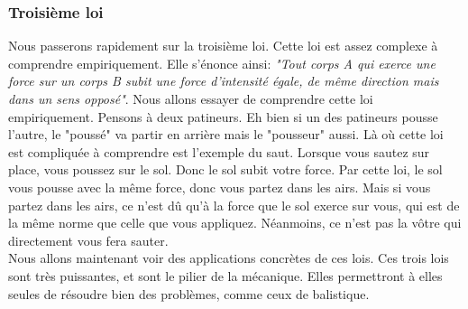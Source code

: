 \documentclass{article}
\begin{document}
\subsubsection{Troisième loi}
Nous passerons rapidement sur la troisième loi. Cette loi est assez complexe à comprendre empiriquement. Elle s'énonce ainsi: \textit{"Tout corps A qui exerce une force sur un corps B subit une force d'intensité égale, de même direction mais dans un sens opposé"}. 
Nous allons essayer de comprendre cette loi empiriquement. Pensons à deux patineurs. Eh bien si un des patineurs pousse l'autre, le "poussé" va partir en arrière 
mais le "pousseur" aussi. Là où cette loi est compliquée à comprendre est l'exemple du saut. Lorsque vous sautez sur place, vous poussez sur le sol. Donc le sol
subit votre force. Par cette loi, le sol vous pousse avec la même force, donc vous partez dans les airs. Mais si vous partez dans les airs, ce n'est dû qu'à
la force que le sol exerce sur vous, qui est de la même norme que celle que vous appliquez. Néanmoins, ce n'est pas la vôtre qui directement vous fera sauter. \\
Nous allons maintenant voir des applications concrètes de ces lois. 
Ces trois lois sont très puissantes, et sont le pilier de la mécanique. Elles permettront à elles seules de résoudre bien des problèmes,
comme ceux de balistique. 
\end{document}
